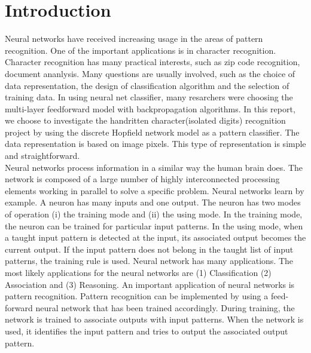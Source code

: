 \section{Introduction}
Neural networks have received increasing usage in the areas of pattern recognition. One of the important applications is in character recognition. Character recognition has many practical interests, such as zip code recognition, document ananlysis. Many questions are usually involved, such as the choice of data representation, the design of classification algorithm and the selection of training data. In using neural net classifier, many resarchers were choosing the multi-layer feedforward model with backpropagation algorithms. In this report, we choose to investigate the handritten character(isolated digits) recognition project by using the discrete Hopfield network model as a pattern classifier. The data representation is based on image pixels. This type of representation is simple and straightforward. \\

Neural networks process information in a similar way the human brain does. The network is composed of a large number of highly interconnected processing elements working in parallel to solve a specific problem. Neural networks learn by example. A neuron has many inputs and one output. The neuron has two modes of operation (i) the training mode and (ii) the using mode. In the training mode, the neuron can be trained for particular input patterns. In the using mode, when a taught input pattern is detected at the input, its associated output becomes the current output. If the input pattern does not belong in the taught list of input patterns, the training rule is used. Neural network has many applications. The most likely applications for the neural networks are (1) Classification (2) Association and (3) Reasoning. An important application of neural networks is pattern recognition. Pattern recognition can be implemented by using a feed-forward neural network that has been trained accordingly. During training, the network is trained to associate outputs with input patterns. When the network is used, it identifies the input pattern and tries to output the associated output pattern.
